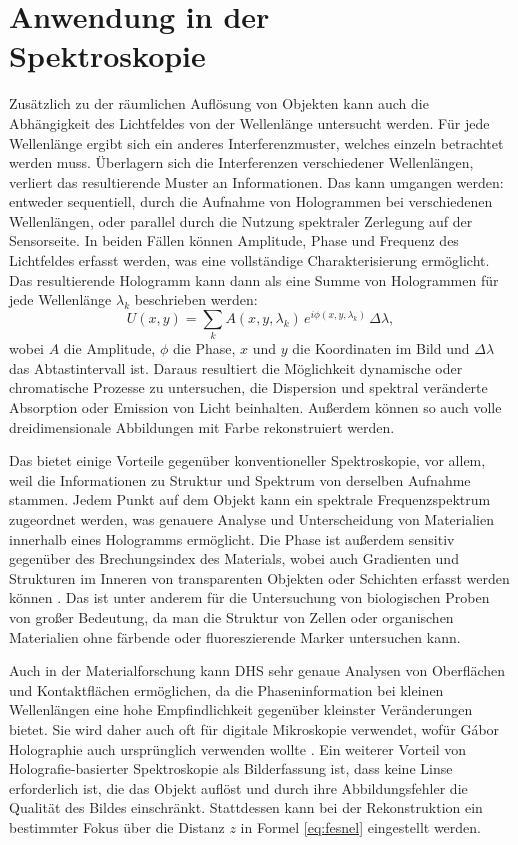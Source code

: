 \documentclass[10pt,twocolumn,a4paper]{article}
\begin{document}
\section{Anwendung in der \\Spektroskopie}
Zusätzlich zu der räumlichen Auflösung von Objekten kann auch die Abhängigkeit des Lichtfeldes von der Wellenlänge untersucht werden. Für jede Wellenlänge ergibt sich ein anderes Interferenzmuster, welches einzeln betrachtet werden muss. Überlagern sich die Interferenzen verschiedener Wellenlängen, verliert das resultierende Muster an Informationen. Das kann umgangen werden: entweder sequentiell, durch die Aufnahme von Hologrammen bei verschiedenen Wellenlängen, oder parallel durch die Nutzung spektraler Zerlegung auf der Sensorseite. In beiden Fällen können Amplitude, Phase und Frequenz des Lichtfeldes erfasst werden, was eine vollständige Charakterisierung ermöglicht. Das resultierende Hologramm kann dann als eine Summe von Hologrammen für jede Wellenlänge $\lambda_k$ beschrieben werden:
\begin{equation}
    U(x, y) = \sum_k A(x, y, \lambda_k)\, e^{i \phi(x, y, \lambda_k)}\, \Delta\lambda,
\end{equation}
wobei $A$ die Amplitude, $\phi$ die Phase, $x$ und $y$ die Koordinaten im Bild und $\Delta\lambda$ das Abtastintervall ist.
Daraus resultiert die Möglichkeit dynamische oder chromatische Prozesse zu untersuchen, die Dispersion und spektral veränderte Absorption oder Emission von Licht beinhalten. Außerdem können so auch volle dreidimensionale Abbildungen mit Farbe rekonstruiert werden.

Das bietet einige Vorteile gegenüber konventioneller Spektroskopie, vor allem, weil die Informationen zu Struktur und Spektrum von derselben Aufnahme stammen. Jedem Punkt auf dem Objekt kann ein spektrale Frequenzspektrum zugeordnet werden, was genauere Analyse und Unterscheidung von Materialien innerhalb eines Hologramms ermöglicht. Die Phase ist außerdem sensitiv gegenüber des Brechungsindex des Materials, wobei auch Gradienten und Strukturen im Inneren von transparenten Objekten oder Schichten erfasst werden können \cite{industrial}. Das ist unter anderem für die Untersuchung von biologischen Proben von großer Bedeutung, da man die Struktur von Zellen oder organischen Materialien ohne färbende oder fluoreszierende Marker untersuchen kann. 

Auch in der Materialforschung kann DHS sehr genaue Analysen von Oberflächen und Kontaktflächen ermöglichen, da die Phaseninformation bei kleinen Wellenlängen eine hohe Empfindlichkeit gegenüber kleinster Veränderungen bietet. Sie wird daher auch oft für digitale Mikroskopie verwendet, wofür Gábor Holographie auch ursprünglich verwenden wollte \cite{DHM}. Ein weiterer Vorteil von Holografie-basierter Spektroskopie als Bilderfassung ist, dass keine Linse erforderlich ist, die das Objekt auflöst und durch ihre Abbildungsfehler die Qualität des Bildes einschränkt. Stattdessen kann bei der Rekonstruktion ein bestimmter Fokus über die Distanz $z$ in Formel \ref{eq:fesnel} eingestellt werden.
\end{document}
